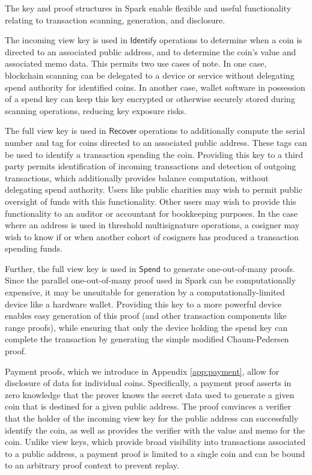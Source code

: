 \documentclass{llncs}
\newcommand{\func}[1]{\mathsf{#1}}
\begin{document}
The key and proof structures in Spark enable flexible and useful functionality relating to transaction scanning, generation, and disclosure.

The incoming view key is used in $\func{Identify}$ operations to determine when a coin is directed to an associated public address, and to determine the coin's value and associated memo data.
This permits two use cases of note.
In one case, blockchain scanning can be delegated to a device or service without delegating spend authority for identified coins.
In another case, wallet software in possession of a spend key can keep this key encrypted or otherwise securely stored during scanning operations, reducing key exposure risks.

The full view key is used in $\func{Recover}$ operations to additionally compute the serial number and tag for coins directed to an associated public address.
These tags can be used to identify a transaction spending the coin.
Providing this key to a third party permits identification of incoming transactions and detection of outgoing transactions, which additionally provides balance computation, without delegating spend authority.
Users like public charities may wish to permit public oversight of funds with this functionality.
Other users may wish to provide this functionality to an auditor or accountant for bookkeeping purposes.
In the case where an address is used in threshold multisignature operations, a cosigner may wish to know if or when another cohort of cosigners has produced a transaction spending funds.

Further, the full view key is used in $\func{Spend}$ to generate one-out-of-many proofs.
Since the parallel one-out-of-many proof used in Spark can be computationally expensive, it may be unsuitable for generation by a computationally-limited device like a hardware wallet.
Providing this key to a more powerful device enables easy generation of this proof (and other transaction components like range proofs), while ensuring that only the device holding the spend key can complete the transaction by generating the simple modified Chaum-Pedersen proof.

Payment proofs, which we introduce in Appendix \ref{app:payment}, allow for disclosure of data for individual coins.
Specifically, a payment proof asserts in zero knowledge that the prover knows the secret data used to generate a given coin that is destined for a given public address.
The proof convinces a verifier that the holder of the incoming view key for the public address can successfully identify the coin, as well as provides the verifier with the value and memo for the coin.
Unlike view keys, which provide broad visibility into transactions associated to a public address, a payment proof is limited to a single coin and can be bound to an arbitrary proof context to prevent replay.
\end{document}
